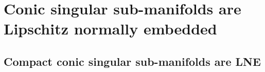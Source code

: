 \documentclass[11pt]{amsart}
\newtheorem{remark}[theorem]{Remark}
\newcommand{\ba}{{\bf a}}
\newcommand{\dd}{{\partial}}
\newcommand{\ff}{{\rm ff}}
\newcommand{\sgm}{\sigma}
\numberwithin{equation}{section}
\numberwithin{equation}{section}
\begin{document}
	\section{Conic singular sub-manifolds are Lipschitz normally embedded}
	
	\subsection{Compact conic singular sub-manifolds are LNE}\label{section:MRCC}
	$ $
	
	
\end{document}
